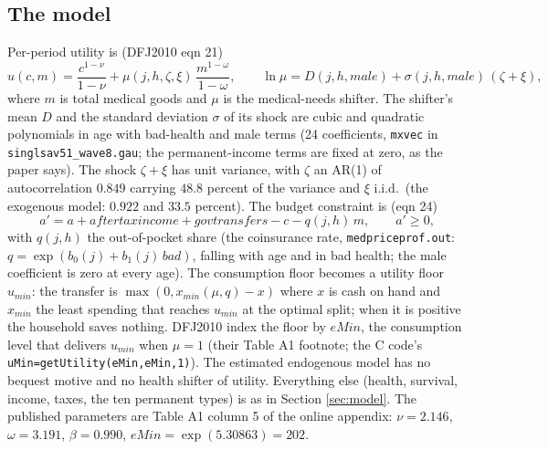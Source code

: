 \documentclass[11pt,fleqn]{article}
\begin{document}
\subsection{The model}
Per-period utility is (DFJ2010 eqn 21)
\begin{equation*}
 u(c,m)=\frac{c^{1-\nu}}{1-\nu}+\mu(j,h,\zeta,\xi)\,\frac{m^{1-\omega}}{1-\omega}, \qquad \ln\mu = D(j,h,male)+\sigma(j,h,male)\,(\zeta+\xi),
\end{equation*}
where $m$ is total medical goods and $\mu$ is the medical-needs shifter. The shifter's mean $D$ and the standard deviation $\sigma$ of its shock are cubic and quadratic polynomials in age with bad-health and male terms (24 coefficients, \texttt{mxvec} in \texttt{singlsav51\_wave8.gau}; the permanent-income terms are fixed at zero, as the paper says). The shock $\zeta+\xi$ has unit variance, with $\zeta$ an AR(1) of autocorrelation $0.849$ carrying $48.8$ percent of the variance and $\xi$ i.i.d.\ (the exogenous model: $0.922$ and $33.5$ percent). The budget constraint is (eqn 24)
\begin{equation*}
 a'=a+aftertaxincome+govtransfers-c-q(j,h)\,m, \qquad a'\geq 0,
\end{equation*}
with $q(j,h)$ the out-of-pocket share (the coinsurance rate, \texttt{medpriceprof.out}: $q=\exp(b_0(j)+b_1(j)\,bad)$, falling with age and in bad health; the male coefficient is zero at every age). The consumption floor becomes a utility floor $u_{min}$: the transfer is $\max(0,x_{min}(\mu,q)-x)$ where $x$ is cash on hand and $x_{min}$ the least spending that reaches $u_{min}$ at the optimal split; when it is positive the household saves nothing. DFJ2010 index the floor by $eMin$, the consumption level that delivers $u_{min}$ when $\mu=1$ (their Table A1 footnote; the C code's \texttt{uMin=getUtility(eMin,eMin,1)}). The estimated endogenous model has no bequest motive and no health shifter of utility. Everything else (health, survival, income, taxes, the ten permanent types) is as in Section \ref{sec:model}. The published parameters are Table A1 column 5 of the online appendix: $\nu=2.146$, $\omega=3.191$, $\beta=0.990$, $eMin=\exp(5.30863)=202$.
\end{document}
